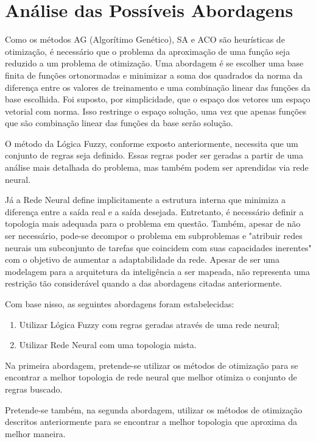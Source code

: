 \chapter{Análise das Possíveis Abordagens}\label{cap:anal_abordagens}


Como os métodos AG (Algorítimo Genético),
SA e ACO são heurísticas de otimização, é necessário que o problema da aproximação
de uma função seja reduzido a um problema de otimização. Uma abordagem é se escolher uma
base finita de funções ortonormadas e minimizar a soma dos quadrados da norma da diferença
entre os valores de treinamento e uma combinação linear das funções da base escolhida.
Foi suposto, por simplicidade, que o espaço dos vetores um espaço vetorial com norma. Isso restringe o
espaço solução, uma vez que apenas funções que são combinação linear das funções da base serão solução.

O método da Lógica Fuzzy, conforme exposto anteriormente, necessita que um conjunto de regras seja definido.
Essas regras poder ser geradas a partir de uma análise mais detalhada do problema, mas também podem ser
aprendidas via rede neural.

Já a Rede Neural define implicitamente a estrutura interna
que minimiza a diferença entre a saída real e a saída desejada.
Entretanto, é necessário definir a topologia mais adequada para o
problema em questão. Também, apesar de não ser necessário, pode-se
decompor o problema em subproblemas e "atribuir redes neurais um
subconjunto de tarefas que coincidem com suas capacidades
inerentes" \cite[pag. 29]{haykin2001redes} com o objetivo de aumentar a
adaptabilidade da rede. Apesar de ser uma modelagem para a arquitetura
da inteligência a ser mapeada, não representa uma restrição tão
considerável quando a das abordagens citadas anteriormente.

Com base nisso, as seguintes abordagens foram estabelecidas:

\begin{enumerate}
 \item Utilizar Lógica Fuzzy com regras geradas através de uma rede neural;
 \item Utilizar Rede Neural com uma topologia mista.
\end{enumerate}

Na primeira abordagem, pretende-se utilizar os métodos de otimização para se
encontrar a melhor topologia de rede neural que melhor otimiza o conjunto de
regras buscado.

Pretende-se também, na segunda abordagem, utilizar os métodos de otimização
descritos anteriormente para se encontrar a melhor topologia que aproxima da
melhor maneira.
